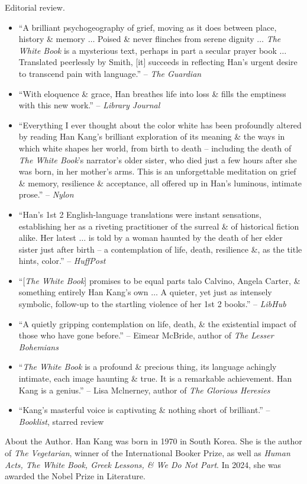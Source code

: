 \documentclass{article}
\begin{document}
\begin{enumerate}
	{\sf Editorial review.}
	\begin{itemize}
		\item ``A brilliant psychogeography of grief, moving as it does between place, history \& memory $\ldots$ Poised \& never flinches from serene dignity $\ldots$ {\it The White Book} is a mysterious text, perhaps in part a secular prayer book $\ldots$ Translated peerlessly by {\sc Smith}, [it] succeeds in reflecting {\sc Han}'s urgent desire to transcend pain with language.'' -- {\it The Guardian}
		\item ``With eloquence \& grace, {\sc Han} breathes life into loss \& fills the emptiness with this new work.'' -- {\it Library Journal}
		\item ``Everything I ever thought about the color white has been profoundly altered by reading {\sc Han Kang}'s brilliant exploration of its meaning \& the ways in which white shapes her world, from birth to death -- including the death of {\it The White Book}'s narrator's older sister, who died just a few hours after she was born, in her mother's arms. This is an unforgettable meditation on grief \& memory, resilience \& acceptance, all offered up in {\sc Han}'s luminous, intimate prose.'' -- {\it Nylon}
		\item ``{\sc Han}'s 1st 2 English-language translations were instant sensations, establishing her as a riveting practitioner of the surreal \& of historical fiction alike. Her latest $\ldots$ is told by a woman haunted by the death of her elder sister just after birth -- a contemplation of life, death, resilience \&, as the title hints, color.'' -- {\it HuffPost}
		\item ``[{\it The White Book}] promises to be equal parts {\sc talo Calvino, Angela Carter}, \& something entirely {\sc Han Kang}'s own $\ldots$ A quieter, yet just as intensely symbolic, follow-up to the startling violence of her 1st 2 books.'' -- {\it LibHub}
		\item ``A quietly gripping contemplation on life, death, \& the existential impact of those who have gone before.'' -- {\sc Eimear McBride}, author of {\it The Lesser Bohemians}
		\item ``{\it The White Book} is a profound \& precious thing, its language achingly intimate, each image haunting \& true. It is a remarkable achievement. {\sc Han Kang} is a genius.'' -- {\sc Lisa Mclnerney}, author of {\it The Glorious Heresies}
		\item ``{\sc Kang}'s masterful voice is captivating \& nothing short of brilliant.'' -- {\it Booklist}, starred review
	\end{itemize}
	{\sf About the Author.} {\sc Han Kang} was born in 1970 in South Korea. She is the author of {\it The Vegetarian}, winner of the International Booker Prize, as well as {\it Human Acts, The White Book, Greek Lessons, \& We Do Not Part}. In 2024, she was awarded the Nobel Prize in Literature.


\end{enumerate}
\end{document}
